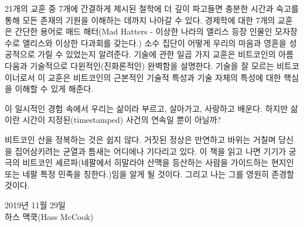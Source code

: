 21개의 교훈 중 7개에 간결하게 제시된 철학에 더 깊이 파고들면 충분한 시간과 숙고를 통해 모든 존재의 기원을 이해하는 데까지 나아갈 수 있다. 
경제학에 대한 7개의 교훈은 간단한 용어로 매드 해터(Mad Hatters - 이상한 나라의 앨리스 등장 인물인 모자장수로 앨리스와 이상한 다과회를 갖는다.) 소수 집단이 어떻게 우리의 마음과 영혼을 성공적으로 가릴 수 있었는지 알려준다. 
기술에 관한 일곱 가지 교훈은 비트코인의 아름다움과 기술적으로 다윈적인(진화론적인) 완벽함을 설명한다. 
기술을 잘 모르는 비트코이너로서 이 교훈은 비트코인의 근본적인 기술적 특성과 기술 자체의 특성에 대한 핵심을 이해할 수 있게 해준다.


이 일시적인 경험 속에서 우리는 삶이라 부르고, 살아가고, 사랑하고 배운다. 
하지만 삶이란 시간이 지정된(timestamped) 사건의 연속일 뿐이 아닐까? 


비트코인 산을 정복하는 것은 쉽지 않다. 거짓된 정상은 만연하고 바위는 거칠며 당신을 집어삼키려는 균열과 틈새는 어디에나 기다리고 있다.
이 책을 읽고 나면 기기가 궁극의 비트코인 셰르파(네팔에서 히말라야 산맥을 등산하는 사람을 가이드하는 현지인 또는 네팔 특정 민족을 칭한다.)임을 알게 될 것이다. 
그리고 나는 그를 영원히 존경할 것이다. 


\begin{flushright}
	2019년 11월 29일 \\
	하스 맥쿡(Hass McCook)
\end{flushright}
